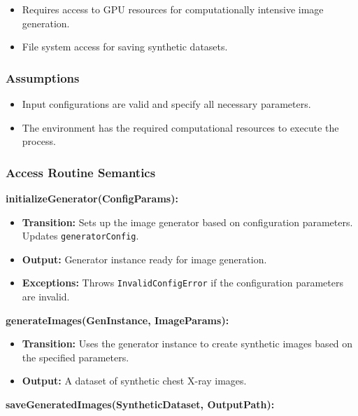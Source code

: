 \documentclass[12pt, titlepage]{article}
\begin{document}
\begin{itemize}
    \item Requires access to GPU resources for computationally intensive image generation.
    \item File system access for saving synthetic datasets.
\end{itemize}

\subsubsection{Assumptions}
\label{sec:ConfigModuleAssumptions}

\begin{itemize}
    \item Input configurations are valid and specify all necessary parameters.
    \item The environment has the required computational resources to execute the process.
\end{itemize}

\subsubsection{Access Routine Semantics}
\label{sec:ConfigModuleAccessRoutineSemantics}

\textbf{initializeGenerator(ConfigParams):}

\begin{itemize}
    \item \textbf{Transition:} Sets up the image generator based on configuration parameters. Updates \texttt{generatorConfig}.
    \item \textbf{Output:} Generator instance ready for image generation.
    \item \textbf{Exceptions:} Throws \texttt{InvalidConfigError} if the configuration parameters are invalid.
\end{itemize}

\textbf{generateImages(GenInstance, ImageParams):}

\begin{itemize}
    \item \textbf{Transition:} Uses the generator instance to create synthetic images based on the specified parameters.
    \item \textbf{Output:} A dataset of synthetic chest X-ray images.
\end{itemize}

\textbf{saveGeneratedImages(SyntheticDataset, OutputPath):}
\end{document}

